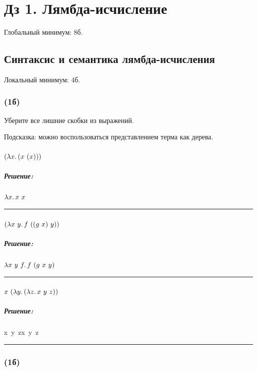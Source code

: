 \documentclass{article}
\newenvironment{proof}{\subparagraph{\hspace{-1em}Решение:\newline}\-}{\par\noindent\rule{\textwidth}{0.4pt}}
\begin{document}
    \section*{Дз 1. Лямбда-исчисление}

    Глобальный минимум: 8б.

    \subsection{Синтаксис и семантика лямбда-исчисления}

    Локальный минимум: 4б.

    \subsubsection{(1б)}

    Уберите все лишние скобки из выражений.

    Подсказка: можно воспользоваться представлением терма как дерева.

    \paragraph{}

    $(\lambda x\ldotp (x~(x)))$

    \begin{proof}
        \(\lambda x\ldotp x~x\)
    \end{proof}

    \paragraph{}

    $(\lambda x~y \ldotp f~((g~x)~y))$

    \begin{proof}
        \(\lambda x~y~f\ldotp f~(g~x~y)\)
    \end{proof}

    \paragraph{}

    $x ~ (\lambda y\ldotp (\lambda z \ldotp x~y~z))$

    \begin{proof}
        x~\lambda y~z\ldotp x~y~z
    \end{proof}

    \subsubsection{(1б)}
\end{document}
